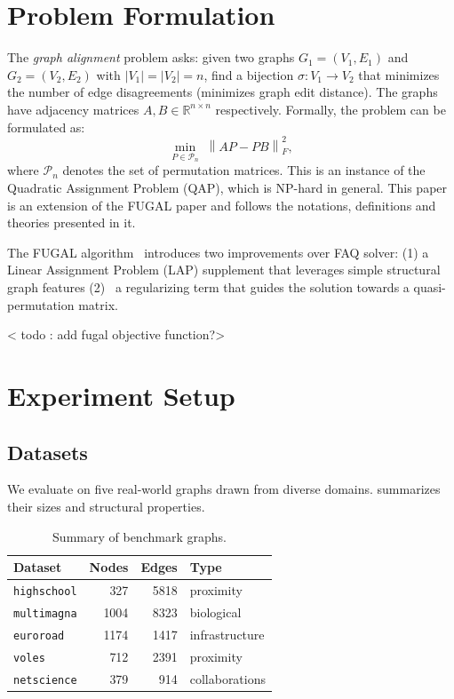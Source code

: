 \documentclass[11pt,a4paper]{article}
\newcommand{\R}{\mathbb{R}}
\newcommand{\frob}[1]{\left\lVert #1 \right\rVert_F}
\newcommand{\Perm}{\mathcal{P}}
\begin{document}
\section{Problem Formulation}

The \emph{graph alignment} problem asks: given two
graphs $G_1=(V_1,E_1)$ and $G_2=(V_2,E_2)$ with $|V_1|=|V_2|=n$, find a
bijection $\sigma:V_1\to V_2$ that minimizes the number of edge disagreements (minimizes graph edit distance). The graphs have adjacency
matrices $A,B\in\R^{n\times n}$ respectively.
Formally, the problem can be formulated as:
\begin{equation}
   \min_{P\in\Perm_n} \; \frob{AP - PB}^2,
  \label{eq:qap}
\end{equation}
where $\Perm_n$ denotes the set of permutation matrices.  This is
an instance of the Quadratic Assignment Problem (QAP), which is NP-hard in
general. This paper is an extension of the FUGAL paper and follows the notations, definitions and theories presented in it.


The FUGAL algorithm~\cite{fugal2022} introduces two improvements over
FAQ solver: (1) a Linear Assignment Problem (LAP) supplement that leverages
simple structural graph features (2)~ a regularizing term that guides the solution towards a
quasi-permutation matrix.

< todo : add fugal objective function?>





\section{Experiment Setup}
\label{sec:setup}

\subsection{Datasets}

We evaluate on five real-world graphs drawn from diverse domains.
 summarizes their sizes and structural properties.

\begin{table}[H]
  \centering
  \caption{Summary of benchmark graphs.}
  \label{tab:datasets}
  \begin{tabular}{lrrl}
    \toprule
    Dataset & Nodes & Edges & Type \\
    \midrule
    \texttt{highschool}  & 327  & 5818 & proximity \\
    \texttt{multimagna}  & 1004 & 8323 & biological \\
    \texttt{euroroad}    & 1174 & 1417 & infrastructure \\
    \texttt{voles}       & 712  & 2391 & proximity \\
    \texttt{netscience}  & 379  & 914  & collaborations \\
    \bottomrule
  \end{tabular}
\end{table}
\end{document}
